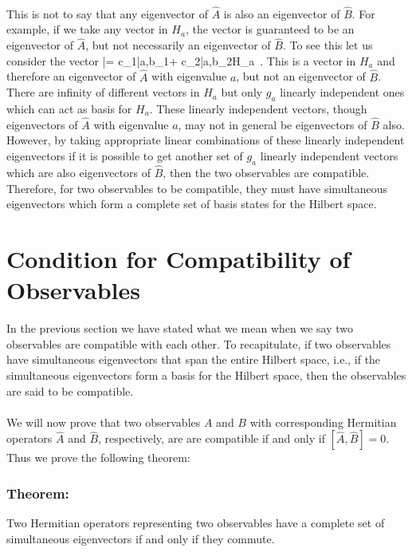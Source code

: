 \paragraph{}
This is not to say that any eigenvector 
of $\hat{A}$ is also an eigenvector of $\hat{B}$. For example, if we take any vector in $H_a$, the vector is guaranteed to be an eigenvector of $\hat{A}$, but not necessarily an eigenvector of $\hat{B}$. To see this let us consider the vector
\be
|\psi\rangle = c_1|a,b_1\rangle + c_2|a,b_2\rangle \in H_a\, .
\ee
This is a vector in $H_a$ and therefore an eigenvector of $\hat{A}$ with eigenvalue $a$, but not an eigenvector of $\hat{B}$. 
There are infinity of different vectors in $H_a$ but only $g_a$ linearly independent ones which can act as basis for $H_a$. 
These linearly independent vectors,  though eigenvectors of $\hat{A}$ with eigenvalue $a$, may not in general  be eigenvectors of $\hat{B}$ also. However, by taking appropriate linear combinations of these linearly independent eigenvectors if it is
possible to get another set of $g_a$ linearly independent vectors which are also eigenvectors of $\hat{B}$, then the two observables are compatible. Therefore, for two observables to be compatible, they must have simultaneous eigenvectors which form
a complete set of basis states for the Hilbert space.


\section{Condition for Compatibility of Observables}
In the previous section we have stated what we mean when we say two observables are compatible with each other.
To recapitulate, if two observables have simultaneous eigenvectors that span the entire Hilbert space, i.e., if the simultaneous 
eigenvectors form a basis for the Hilbert space, then the observables are said to be compatible.

\paragraph{} 
We will now prove that two observables $A$ and $B$ with corresponding Hermitian operators $\hat{A}$ and $\hat{B}$, respectively, are 
 are compatible if and only if $[\hat{A},\hat{B}]=0$. Thus we prove the following theorem:

\subsubsection{Theorem: }
Two Hermitian operators representing two observables have a complete set of simultaneous eigenvectors if and only if they commute.

